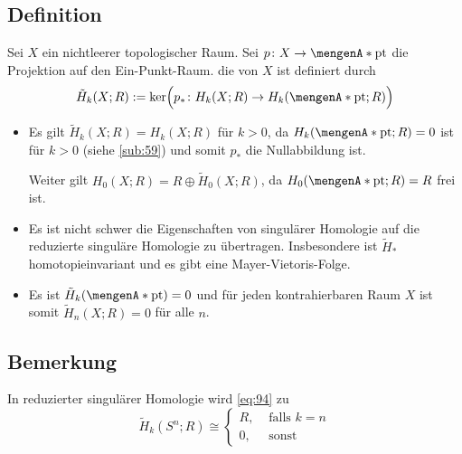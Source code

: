 \subsection[Definition: Reduzierte Homologie]{Definition} %
\label{sub:95}
Sei $X$ ein nichtleerer topologischer Raum. Sei $p \colon X  \to \set{\mathrm{pt}}$ die Projektion auf den Ein-Punkt-Raum. die  von $X$ ist definiert
durch 
\[
	\tilde{H}_k(X;R) := \ker \enbrace[\Big]{ p_* \colon H_k(X;R) \to H_k(\set{\mathrm{pt}};R )} 
\]
\begin{itemize}
	\item Es gilt $\tilde{H}_k(X;R) =H_k(X;R)$ für $k>0$, da $H_k \enbrace*{\set{\mathrm{pt}};R }=0$ ist für $k>0$ (siehe \ref{sub:59}) und somit $p_*$ die Nullabbildung ist.
	
	Weiter gilt $H_0(X;R) = R \oplus \tilde{H}_0(X;R)$, da $H_0(\set{\mathrm{pt}};R)=R$ frei ist.
	\item Es ist nicht schwer die Eigenschaften von singulärer Homologie auf die reduzierte singuläre Homologie zu übertragen. Insbesondere ist $\tilde{H}_*$ 
	homotopieinvariant und es gibt eine Mayer-Vietoris-Folge.
	\item Es ist $\tilde{H}_k \enbrace*{\set{\mathrm{pt}}}=0$ und für jeden kontrahierbaren Raum $X$ ist somit $\tilde{H}_n(X;R)=0$ für alle $n$.
\end{itemize}

\subsection[Bemerkung: Die Aussage von Satz \ref{sub:94} in reduzierter Homologie]{Bemerkung} %
\label{sub:96}
In reduzierter singulärer Homologie wird \eqref{eq:94} zu
\begin{equation*}
	\tilde{H}_k(S^n;R) \cong \begin{cases}
		R, &\text{ falls }k=n\\
		0 , &\text{ sonst}
	\end{cases} \label{eq:96}\tag{\#\#}
\end{equation*}


